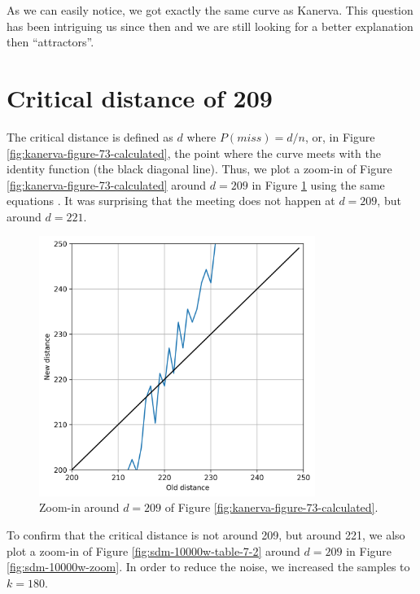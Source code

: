 As we can easily notice, we got exactly the same curve as Kanerva. This question has been intriguing us since then and we are still looking for a better explanation then ``attractors''.


\section{Critical distance of 209}

The critical distance is defined as $d$ where $P(miss) = d/n$, or, in Figure \ref{fig:kanerva-figure-73-calculated}, the point where the curve meets with the identity function (the black diagonal line). Thus, we plot a zoom-in of Figure \ref{fig:kanerva-figure-73-calculated} around $d=209$ in Figure \ref{fig:figure-73-eq-zoom-in} using the same equations \citep{brogliato2014sparse}. It was surprising that the meeting does not happen at $d=209$, but around $d=221$.

\begin{figure}[!htb]
\centering\includegraphics[width=0.8\textwidth]{./images02/figure-73-eq-zoom.png}
\caption{Zoom-in around $d=209$ of Figure \ref{fig:kanerva-figure-73-calculated}.
\label{fig:figure-73-eq-zoom-in}
}
\end{figure}

To confirm that the critical distance is not around 209, but around 221, we also plot a zoom-in of Figure \ref{fig:sdm-10000w-table-7-2} around $d=209$ in Figure \ref{fig:sdm-10000w-zoom}. In order to reduce the noise, we increased the samples to $k=180$.

